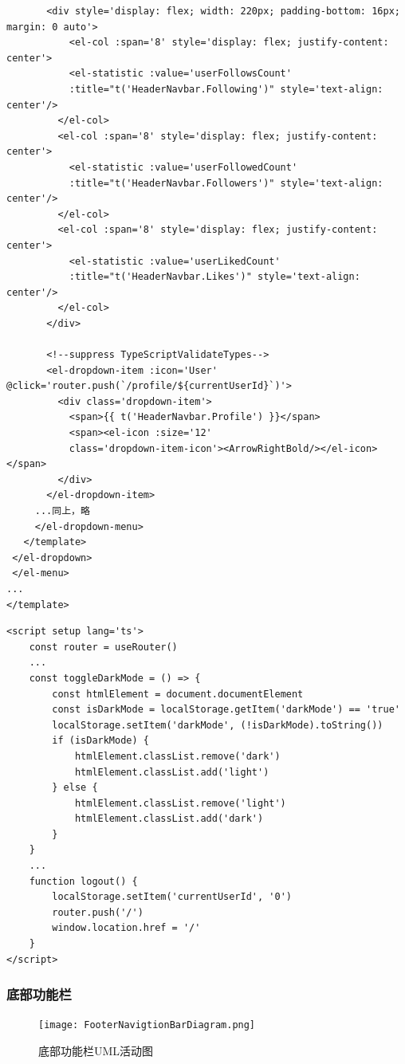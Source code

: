 \begin{itemize}
\begin{verbatim}
       <div style='display: flex; width: 220px; padding-bottom: 16px; margin: 0 auto'>
       	   <el-col :span='8' style='display: flex; justify-content: center'>
           <el-statistic :value='userFollowsCount' 
           :title="t('HeaderNavbar.Following')" style='text-align: center'/>
         </el-col>
         <el-col :span='8' style='display: flex; justify-content: center'>
           <el-statistic :value='userFollowedCount' 
           :title="t('HeaderNavbar.Followers')" style='text-align: center'/>
         </el-col>
         <el-col :span='8' style='display: flex; justify-content: center'>
           <el-statistic :value='userLikedCount' 
           :title="t('HeaderNavbar.Likes')" style='text-align: center'/>
         </el-col>
       </div>
	
       <!--suppress TypeScriptValidateTypes-->
       <el-dropdown-item :icon='User' @click='router.push(`/profile/${currentUserId}`)'>
         <div class='dropdown-item'>
           <span>{{ t('HeaderNavbar.Profile') }}</span>
           <span><el-icon :size='12' 
           class='dropdown-item-icon'><ArrowRightBold/></el-icon></span>
         </div>
       </el-dropdown-item>
     ...同上，略
     </el-dropdown-menu>
   </template>
 </el-dropdown>
 </el-menu>
...
</template>
	\end{verbatim}
	
	\begin{verbatim}
<script setup lang='ts'>
	const router = useRouter()
	...
	const toggleDarkMode = () => {
		const htmlElement = document.documentElement
		const isDarkMode = localStorage.getItem('darkMode') == 'true'
		localStorage.setItem('darkMode', (!isDarkMode).toString())
		if (isDarkMode) {
			htmlElement.classList.remove('dark')
			htmlElement.classList.add('light')
		} else {
			htmlElement.classList.remove('light')
			htmlElement.classList.add('dark')
		}
	}
	...
	function logout() {
		localStorage.setItem('currentUserId', '0')
		router.push('/')
		window.location.href = '/'
	}
</script>
	\end{verbatim}

\end{itemize}

\subsubsection{底部功能栏}

\begin{figure}[H]
	\centering
	\texttt{[image: FooterNavigtionBarDiagram.png]} 
	\caption{底部功能栏UML活动图}
	\label{fig:FooterNavigtionBarDiagram}
\end{figure}

